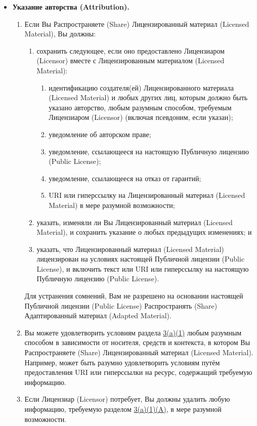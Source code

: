 \begin{itemize}
\item[a.] \textbf{Указание авторства (Attribution).}
	\begin{enumerate}
	\item Если Вы Распространяете (Share) Лицензированный материал (Licensed Material), Вы должны:
		\begin{enumerate}
		\item[A.] сохранить следующее, если оно предоставлено Лицензиаром (Licensor) вместе с Лицензированным материалом (Licensed Material):
			\begin{enumerate}
			\item идентификацию создателя(ей) Лицензированного материала (Licensed Material) и любых других лиц, которым должно быть указано авторство, любым разумным способом, требуемым Лицензиаром (Licensor) (включая псевдоним, если указан);
			\item уведомление об авторском праве;
			\item уведомление, ссылающееся на настоящую Публичную лицензию (Public License);
			\item уведомление, ссылающееся на отказ от гарантий;
			\item URI или гиперссылку на Лицензированный материал (Licensed Material) в мере разумной возможности;
			\end{enumerate}
		\item[B.] указать, изменяли ли Вы Лицензированный материал (Licensed Material), и сохранить указание о любых предыдущих изменениях; и
		\item[C.] указать, что Лицензированный материал (Licensed Material) лицензирован на условиях настоящей Публичной лицензии (Public License), и включить текст или URI или гиперссылку на настоящую Публичную лицензию (Public License).
		\end{enumerate}
Для устранения сомнений, Вам не разрешено на основании настоящей Публичной лицензии (Public License) Распространять (Share) Адаптированный материал (Adapted Material).
\item Вы можете удовлетворить условиям раздела \href{https://creativecommons.org/licenses/by-nc-nd/4.0/legalcode#s3a1A}{3(a)(1)} любым разумным способом в зависимости от носителя, средств и контекста, в котором Вы Распространяете (Share) Лицензированный материал (Licensed Material). Например, может быть разумно удовлетворить условиям путём предоставления URI или гиперссылки на ресурс, содержащий требуемую информацию.
\item Если Лицензиар (Licensor) потребует, Вы должны удалить любую информацию, требуемую разделом \href{https://creativecommons.org/licenses/by-nc-nd/4.0/legalcode#s3a1A}{3(a)(1)(A)}, в мере разумной возможности.
	\end{enumerate}
\end{itemize}

